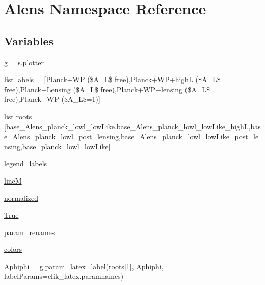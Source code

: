 \hypertarget{namespaceAlens}{}\section{Alens Namespace Reference}
\label{namespaceAlens}
\subsection*{Variables}
\begin{DoxyCompactItemize}
\item 
\mbox{\hyperlink{namespaceAlens_ad7a6a4cbf3e1cecb8bdec34c9035f347}{g}} = s.\+plotter
\item 
list \mbox{\hyperlink{namespaceAlens_a2eba15923a6cb78c6ac26d53d2bd2ee6}{labels}} = \mbox{[}\textquotesingle{}Planck+WP (\$A\+\_\+\+L\$ free)\textquotesingle{},\textquotesingle{}Planck+WP+highL (\$A\+\_\+\+L\$ free)\textquotesingle{},\textquotesingle{}Planck+Lensing (\$A\+\_\+\+L\$ free)\textquotesingle{},\textquotesingle{}Planck+WP+lensing (\$A\+\_\+\+L\$ free)\textquotesingle{},\textquotesingle{}Planck+WP (\$A\+\_\+\+L\$=1)\textquotesingle{}\mbox{]}
\item 
list \mbox{\hyperlink{namespaceAlens_a153a8685dae4e7bca589dcd5ab3570c5}{roots}} = \mbox{[}\textquotesingle{}base\+\_\+\+Alens\+\_\+planck\+\_\+lowl\+\_\+low\+Like\textquotesingle{},\textquotesingle{}base\+\_\+\+Alens\+\_\+planck\+\_\+lowl\+\_\+low\+Like\+\_\+highL\textquotesingle{},\textquotesingle{}base\+\_\+\+Alens\+\_\+planck\+\_\+lowl\+\_\+post\+\_\+lensing\textquotesingle{},\textquotesingle{}base\+\_\+\+Alens\+\_\+planck\+\_\+lowl\+\_\+low\+Like\+\_\+post\+\_\+lensing\textquotesingle{},\textquotesingle{}base\+\_\+planck\+\_\+lowl\+\_\+low\+Like\textquotesingle{}\mbox{]}
\item 
\mbox{\hyperlink{namespaceAlens_a449e1a3b60a0d28348668f2b8624119a}{legend\+\_\+labels}}
\item 
\mbox{\hyperlink{namespaceAlens_a20a2d54d444c9d2a0c3028de50ec088c}{lineM}}
\item 
\mbox{\hyperlink{namespaceAlens_ae5ca2d017ddd94ef34171b2a3a7e0217}{normalized}}
\item 
\mbox{\hyperlink{namespaceAlens_a5c1fb2ace972feb0cd73c73c1e18b58e}{True}}
\item 
\mbox{\hyperlink{namespaceAlens_a7a7b9e42bdac514c808bafe79bae1ffe}{param\+\_\+renames}}
\item 
\mbox{\hyperlink{namespaceAlens_a7ee2dfcbff2768280fd98d5ef305755f}{colors}}
\item 
\mbox{\hyperlink{namespaceAlens_a26d61581ebe70785d0386d82de6c38c9}{Aphiphi}} = g.\+param\+\_\+latex\+\_\+label(\mbox{\hyperlink{namespaceAlens_a153a8685dae4e7bca589dcd5ab3570c5}{roots}}\mbox{[}1\mbox{]}, \textquotesingle{}Aphiphi\textquotesingle{}, label\+Params=\textquotesingle{}clik\+\_\+latex.\+paramnames\textquotesingle{})

\end{DoxyCompactItemize}
